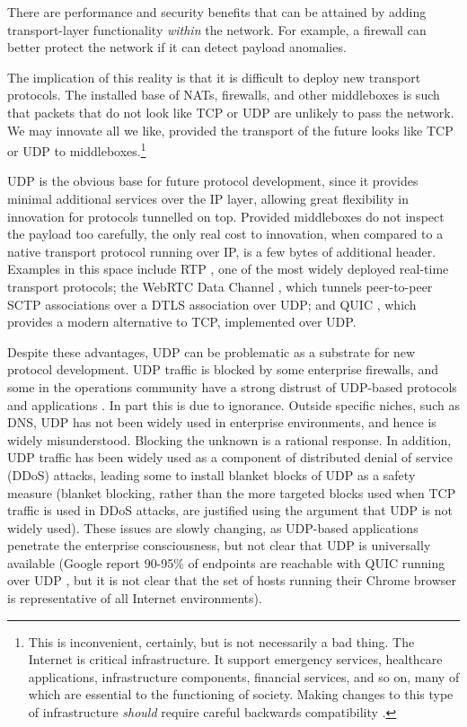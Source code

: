 \documentclass[10pt]{sig-alternate-05-2015}
\begin{document}
There are performance and security benefits that can be attained by
adding transport-layer functionality \emph{within} the network. For
example, a firewall can better protect the network if it can detect payload
anomalies.

The implication of this reality is that it is difficult to deploy new
transport protocols. The installed base of NATs, firewalls, and other
middleboxes is such that packets that do not look like TCP or UDP are
unlikely to pass the network. We may innovate all we like, provided the
transport of the future looks like TCP or UDP to middleboxes.\footnote{
  This is inconvenient, certainly, but is not necessarily a bad thing.
  The Internet is critical infrastructure. It support emergency services,
  healthcare applications, infrastructure components, financial services,
  and so on, many of which are essential to the functioning of society.
  Making changes to this type of infrastructure \emph{should} require
  careful backwards compatibility \cite{mcquistin:2015:reinterpreting}.
}

UDP is the obvious base for future protocol development, since it provides
minimal additional services over the IP layer, allowing great flexibility
in innovation for protocols tunnelled on top. Provided middleboxes do not
inspect the payload too carefully, the only real cost to innovation, when
compared to a native transport protocol running over IP, is a few bytes of
additional header. Examples in this space include RTP \cite{rfc:3550}, one
of the most widely deployed real-time transport protocols; the WebRTC Data
Channel \cite{draft-ietf-rtcweb-data-channel-13}, which tunnels
peer-to-peer SCTP associations over a DTLS association over UDP; and QUIC
\cite{draft-tsvwg-quic-protocol-02}, which provides a modern alternative
to TCP, implemented over UDP.

Despite these advantages, UDP can be problematic as a substrate for new
protocol development. UDP traffic is blocked by some enterprise firewalls,
and some in the operations community have a strong distrust of UDP-based
protocols and applications \cite{draft-byrne-opsec-udp-advisory-00}. In
part this is due to ignorance. Outside specific niches, such as DNS, UDP
has not been widely used in enterprise environments, and hence is widely
misunderstood. Blocking the unknown is a rational response. In addition,
UDP traffic has been widely used as a component of distributed denial of
service (DDoS) attacks, leading some to install blanket blocks of UDP as
a safety measure (blanket blocking, rather than the more targeted blocks
used when TCP traffic is used in DDoS attacks, are justified using the
argument that UDP is not widely used).
These issues are slowly changing, as UDP-based applications penetrate the
enterprise consciousness, but not clear that UDP is universally available
(Google report 90-95\% of endpoints are reachable with QUIC
running over UDP \cite{roskind2013quic}, but it is not clear that the set
of hosts running their Chrome browser is representative of all Internet
environments).
\end{document}
